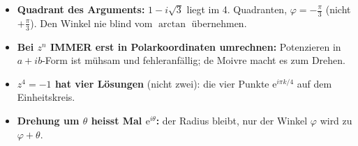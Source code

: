 \begin{achtung}
\begin{itemize}
  \item \textbf{Quadrant des Arguments:} $1-i\sqrt3$ liegt im 4. Quadranten,
        $\varphi=-\tfrac\pi3$ (nicht $+\tfrac\pi3$). Den Winkel nie blind
        vom $\arctan$ übernehmen.
  \item \textbf{Bei $z^n$ IMMER erst in Polarkoordinaten umrechnen:}
        Potenzieren in $a+ib$-Form ist mühsam und fehleranfällig; de Moivre
        macht es zum Drehen.
  \item \textbf{$z^4=-1$ hat vier Lösungen} (nicht zwei): die vier Punkte
        $\mathrm e^{i\pi k/4}$ auf dem Einheitskreis.
  \item \textbf{Drehung um $\theta$ heisst Mal $\mathrm e^{i\theta}$:} der
        Radius bleibt, nur der Winkel $\varphi$ wird zu $\varphi+\theta$.
\end{itemize}
\end{achtung}
